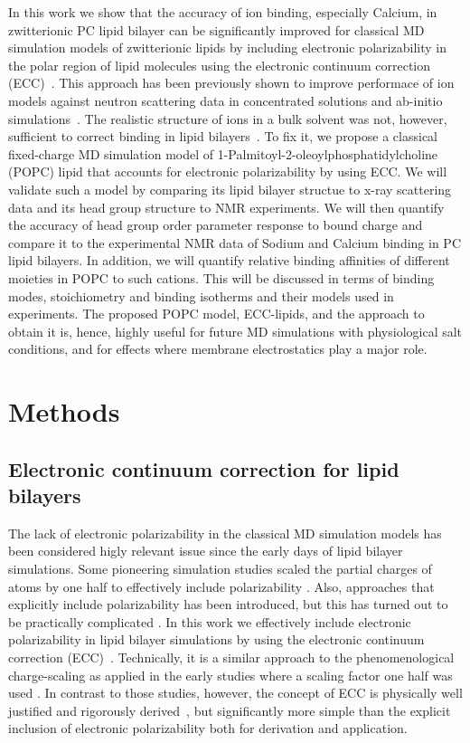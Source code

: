 \documentclass[aip,jcp,twocolumn]{revtex4}
\begin{document}
In this work we show that the accuracy of ion binding, especially Calcium,
in zwitterionic PC lipid bilayer can be significantly improved 
for classical MD simulation models of zwitterionic lipids
by including electronic polarizability
in the polar region of lipid molecules
using the electronic continuum correction (ECC)~\cite{leontyev11}. 
This approach has been previously shown to improve performace of
ion models against neutron scattering data in concentrated solutions \cite{Jungwirth2015,kohagen14,kohagen16}
and ab-initio simulations~\cite{Jungwirth2017}. 
The realistic structure of ions in a bulk solvent was not, however, sufficient to correct binding in lipid
bilayers~\cite{catte16}. 
To fix it, we propose
a classical fixed-charge MD simulation model of 
1-Palmitoyl-2-oleoylphosphatidylcholine (POPC) lipid 
that accounts for electronic polarizability by using ECC. 
We will validate such a model by comparing its lipid bilayer structue
to x-ray scattering data and its head group structure to NMR experiments. 
We will then quantify the accuracy of head group order parameter response to bound charge
and compare it to the experimental NMR data of Sodium and Calcium binding in PC lipid bilayers. 
In addition, we will quantify relative binding affinities of different moieties in POPC to such cations. 
This will be discussed in terms of binding modes, stoichiometry and binding isotherms and their models used in experiments.
The proposed POPC model, ECC-lipids, and the approach to obtain it
is, hence, highly useful for future MD simulations with physiological salt conditions, 
and for effects where membrane electrostatics play a major role.




\section{Methods}

\subsection{Electronic continuum correction for lipid bilayers}
The lack of electronic polarizability in the classical MD simulation
models has been considered higly relevant issue since the early days of
lipid bilayer simulations. Some pioneering simulation studies scaled
the partial charges of atoms by one half to effectively include 
polarizability \cite{jonsson86,egberts94}. Also, approaches that
explicitly include polarizability has been introduced, but
this has turned out to be practically complicated \cite{chowdhary13}.
In this work we effectively include electronic polarizability in lipid
bilayer simulations by using the electronic continuum correction
(ECC)~\cite{leontyev11}. 
Technically, it is a similar approach to the phenomenological charge-scaling as applied in 
the early studies where a scaling factor one half was used \cite{jonsson86,egberts94}. 
In contrast to those studies, however, the concept of ECC is 
physically well justified and rigorously derived~\cite{leontyev09, leontyev10, leontyev11},
but significantly more simple than the explicit inclusion of electronic
polarizability \cite{chowdhary13} both for derivation and application.
\end{document}
